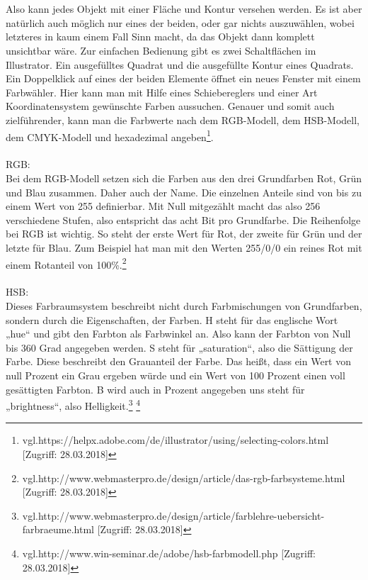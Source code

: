 \leavevmode \\
\leavevmode \\
Also kann jedes Objekt mit einer Fläche und Kontur versehen werden. Es ist aber natürlich auch möglich nur eines der beiden, oder gar nichts auszuwählen, wobei letzteres in kaum einem Fall Sinn macht, da das Objekt dann komplett unsichtbar wäre. Zur einfachen Bedienung gibt es zwei Schaltflächen im Illustrator. Ein ausgefülltes Quadrat und die ausgefüllte Kontur eines Quadrats. Ein Doppelklick auf eines der beiden Elemente öffnet ein neues Fenster mit einem Farbwähler. Hier kann man mit Hilfe eines Schiebereglers und einer Art Koordinatensystem gewünschte Farben aussuchen. Genauer und somit auch zielführender, kann man die Farbwerte nach dem RGB-Modell, dem HSB-Modell, dem CMYK-Modell und hexadezimal angeben\footnote{\label{} vgl.https://helpx.adobe.com/de/illustrator/using/selecting-colors.html [Zugriff: 28.03.2018]}.
\leavevmode \\
\leavevmode \\
RGB:
\leavevmode \\
Bei dem RGB-Modell setzen sich die Farben aus den drei Grundfarben Rot, Grün und Blau zusammen. Daher auch der Name. Die einzelnen Anteile sind von bis zu einem Wert von 255 definierbar. Mit Null mitgezählt macht das also 256 verschiedene Stufen, also entspricht das acht Bit pro Grundfarbe. Die Reihenfolge bei RGB ist wichtig. So steht der erste Wert für Rot, der zweite für Grün und der letzte für Blau. Zum Beispiel hat man mit den Werten 255/0/0 ein reines Rot mit einem Rotanteil von 100\%.\footnote{\label{} vgl.http://www.webmasterpro.de/design/article/das-rgb-farbsysteme.html [Zugriff: 28.03.2018]}
\leavevmode \\
\leavevmode \\
HSB:
\leavevmode \\
Dieses Farbraumsystem beschreibt nicht durch Farbmischungen von Grundfarben, sondern durch die Eigenschaften, der Farben. H steht für das englische Wort „hue“ und gibt den Farbton als Farbwinkel an. Also kann der Farbton von Null bis 360 Grad angegeben werden. S steht für „saturation“, also die Sättigung der Farbe. Diese beschreibt den Grauanteil der Farbe. Das heißt, dass ein Wert von null Prozent ein Grau ergeben würde und ein Wert von 100 Prozent einen voll gesättigten Farbton. B wird auch in Prozent angegeben uns steht für „brightness“, also Helligkeit.\footnote{\label{} vgl.http://www.webmasterpro.de/design/article/farblehre-uebersicht-farbraeume.html [Zugriff: 28.03.2018]}
\footnote{\label{} vgl.http://www.win-seminar.de/adobe/hsb-farbmodell.php [Zugriff: 28.03.2018]}
